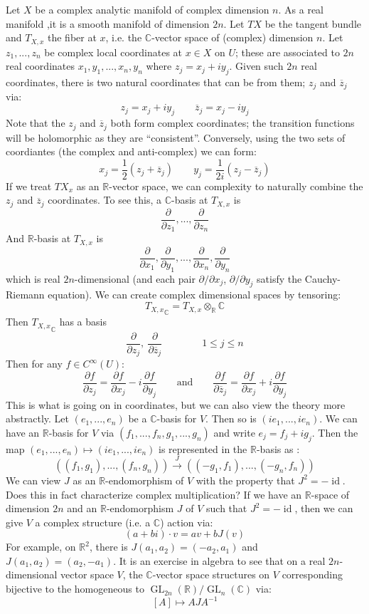 \documentclass{book}
\newcommand{\C}{{\mathbb{C}}}
\newcommand{\R}{{\mathbb{R}}}
\newcommand{\id}{{\operatorname{id}}}
\newcommand{\GL}{{\operatorname{GL}}}
\begin{document}
Let $X$ be a complex analytic manifold of complex dimension $n$. As a real manifold ,it is a smooth manifold
of dimension $2n$. Let $TX$ be the tangent bundle and $T_{X,x}$ the fiber at $x$, i.e. the $\C$-vector space
of (complex) dimension $n$. Let $z_1, ..., z_n$ be complex local coordinates at $x \in X$ on $U$; these are
associated to $2n$ real coordinates $x_1, y_1, ..., x_n, y_n$ where  $z_j = x_j + iy_j$.
Given such $2n$ real coordinates, there is two natural coordinates that can be from them; $z_j$ and $\overline{z}_j$ via:
\[
  z_j = x_j + iy_j \qquad \overline{z}_j = x_j - iy_j
\]
Note that the $z_j$ and $\overline{z}_j$ both form complex coordinates; the transition functions will be
holomorphic as they are ``consistent''. Conversely, using the two sets of coordiantes (the complex and
anti-complex) we can form:
\[
  x_j = \frac{1}{2}(z_j + \overline{z}_j) \qquad y_j = \frac{1}{2i}(z_j - \overline{z}_j)
\]
If we treat $TX_x$ as an $\R$-vector space, we can complexity to naturally combine the $z_j$ and
$\overline{z}_j$ coordinates. To see this, a $\C$-basis at $T_{X,x}$ is
\[
  \frac{\partial }{\partial z_1}, ..., \frac{\partial }{\partial z_n}
\]
And $\R$-basis at $T_{X,x}$ is
\[
  \frac{\partial }{\partial x_1}, \frac{\partial }{\partial y_1}, ..., \frac{\partial }{\partial x_n},
  \frac{\partial }{\partial y_n}
\]
which is real $2n$-dimensional (and each pair $\partial/\partial x_j$, $\partial/\partial y_j$ satisfy the
Cauchy-Riemann equation). We can create complex dimensional spaces by tensoring:
\[
  {T_{X,x}}_\C = T_{X,x}\otimes_\R \C
\]
Then ${T_{X,x}}_\C$ has a basis
\[
  \frac{\partial }{\partial z_j},\ \frac{\partial }{\partial \overline{z}_j} \qquad\qquad1 \le j \le n
\]
Then for any $f\in C^\infty(U)$:
\[
  \frac{\partial f}{\partial z_j} = \frac{\partial f}{\partial x_j} - i\frac{\partial f}{\partial y_j} \qquad
  \text{and} \qquad\frac{\partial f}{\partial \overline{z}_j} = \frac{\partial f}{\partial x_j} + i\frac{\partial f}{\partial y_j}
\]
This is what is going on in coordinates, but we can also view the theory more abstractly. Let $(e_1, ..., e_n)$
be a $\C$-basis for $V$. Then so is $(ie_1, ..., ie_n)$. We can have an $\R$-basis for $V$ via $(f_1, ...,
f_n, g_1, ..., g_n)$ and write $e_j = f_j + ig_j$. Then the map $(e_1, ..., e_n) \mapsto (ie_1, ..., ie_n)$
is represented in the $\R$-basis as :
\[
  \left((f_1, g_1), ..., (f_n, g_n)\right) \xrightarrow{J} \left((-g_1, f_1), ..., (-g_n, f_n)\right)
\]
We can view $J$ as an $\R$-endomorphism of $V$ with the property that $J^2 = -\id$. Does this in fact
characterize complex multiplication? If we have an $\R$-space of dimension $2n$ and an $\R$-endomorphism $J$
of $V$ such that $J^2 = -\id$, then we  can give $V$ a complex structure (i.e. a $\C$) action via:
\[
  (a+bi)\cdot v = av + bJ(v)
\]
For example, on $\R^2$, there is $J(a_1, a_2) = (-a_2, a_1)$ and $J(a_1, a_2) = (a_2, -a_1)$. It is an
exercise in algebra to see that on a real $2n$-dimensional vector space $V$, the $\C$-vector space structures
on $V$ corresponding bijective to the homogeneous to $\GL_{2n}(\R)/\GL_n(\C)$ via:
\[
  [A] \mapsto AJA^{-1}
\]
\end{document}
